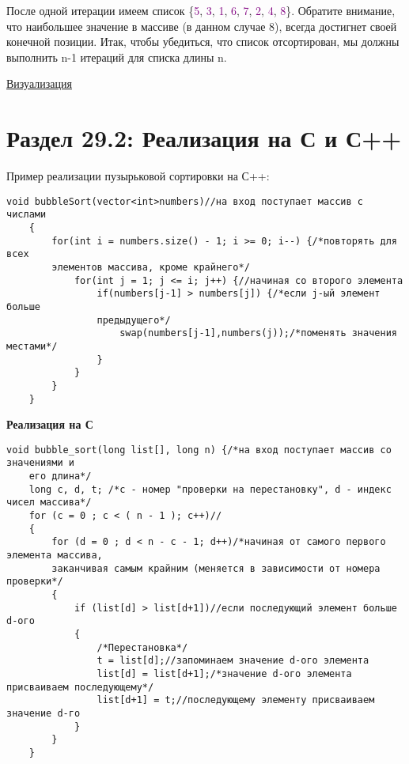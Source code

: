 \vspace{\baselineskip}

После одной итерации имеем список \{\textcolor{Purple}{5}, \textcolor{Purple}{3}, \textcolor{Purple}{1}, \textcolor{Purple}{6}, \textcolor{Purple}{7}, \textcolor{Purple}{2}, \textcolor{Purple}{4}, \textcolor{Purple}{8}\}. Обратите внимание, что наибольшее значение в массиве (в данном случае 8), всегда достигнет своей конечной позиции. Итак, чтобы убедиться, что список отсортирован, мы должны выполнить n-1 итераций для списка длины n.

\vspace{\baselineskip}

\href{http://i.stack.imgur.com/NJPXP.gif}{\underline{Визуализация}}

\section*{Раздел 29.2: Реализация на С и С++}

Пример реализации пузырьковой сортировки на С++:

\vspace{\baselineskip}

\begin{tcolorbox} 
\begin{verbatim}
void bubbleSort(vector<int>numbers)//на вход поступает массив с числами
	{
		for(int i = numbers.size() - 1; i >= 0; i--) {/*повторять для всех 
		элементов массива, кроме крайнего*/
			for(int j = 1; j <= i; j++) {//начиная со второго элемента
				if(numbers[j-1] > numbers[j]) {/*если j-ый элемент больше 
				предыдущего*/
					swap(numbers[j-1],numbers(j));/*поменять значения местами*/
				}
			}
		}
	}
\end{verbatim}
\end{tcolorbox}

\vspace{\baselineskip}

\textbf{Реализация на С} 

\vspace{\baselineskip}

\begin{tcolorbox} 
\begin{verbatim}
void bubble_sort(long list[], long n) {/*на вход поступает массив со значениями и 
	его длина*/
	long c, d, t; /*с - номер "проверки на перестановку", d - индекс чисел массива*/
	for (c = 0 ; c < ( n - 1 ); c++)//
	{
		for (d = 0 ; d < n - c - 1; d++)/*начиная от самого первого элемента массива,
		заканчивая самым крайним (меняется в зависимости от номера проверки*/
		{
			if (list[d] > list[d+1])//если последующий элемент больше d-ого
			{
				/*Перестановка*/
				t = list[d];//запоминаем значение d-ого элемента
				list[d] = list[d+1];/*значение d-ого элемента присваиваем последующему*/
				list[d+1] = t;//последующему элементу присваиваем значение d-го
			}
		}
	}
\end{verbatim}
\end{tcolorbox}


